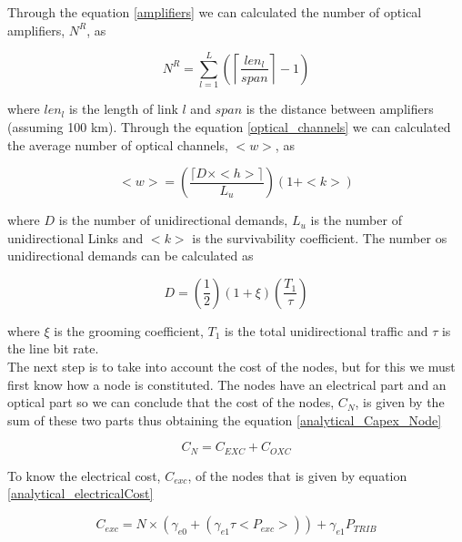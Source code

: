 Through the equation \ref{amplifiers} we can calculated the number of optical amplifiers, $N^R$, as

\begin{equation}
N^R = \sum\limits_{l=1}^L\left(\left\lceil\frac{len_l}{span}\right\rceil-1\right)
\label{amplifiers}
\end{equation}

\vspace{11pt}
\noindent
where $len_l$ is the length of link $l$ and $span$ is the distance between amplifiers (assuming 100 km).
\newpage
Through the equation \ref{optical_channels} we can calculated the average number of optical channels, $<w>$, as

\begin{equation}
<w> = \left( \frac{\lceil D \times <h> \rceil}{L_u} \right) \left( 1 + <k>\right)
\label{optical_channels}
\end{equation}

\noindent
where $D$ is the number of unidirectional demands, $L_u$ is the number of unidirectional Links and $<k>$ is the survivability coefficient.
The number os unidirectional demands can be calculated as

\begin{equation}
D = \left(\frac{1}{2}\right) \left( 1 + \xi \right) \left(\frac{T_1}{\tau}\right)
\label{demands}
\end{equation}

\noindent
where $\xi$ is the grooming coefficient, $T_1$ is the total unidirectional traffic and $\tau$ is the line bit rate.\\

The next step is to take into account the cost of the nodes, but for this we must first know how a node is constituted. The nodes have an electrical part and an optical part so we can conclude that the cost of the nodes, $C_N$, is given by the sum of these two parts thus obtaining the equation \ref{analytical_Capex_Node}

\begin{equation}
C_N = C_{EXC} + C_{OXC}
\label{analytical_Capex_Node}
\end{equation}

\vspace{11pt}
To know the electrical cost, $C_{exc}$, of the nodes that is given by equation \ref{analytical_electricalCost}

\begin{equation}
C_{exc} = N \times \left( \gamma_{e0} + \left( \gamma_{e1} \tau <P_{exc}> \right) \right) + \gamma_{e1} P_{TRIB}
\label{analytical_electricalCost}
\end{equation}

